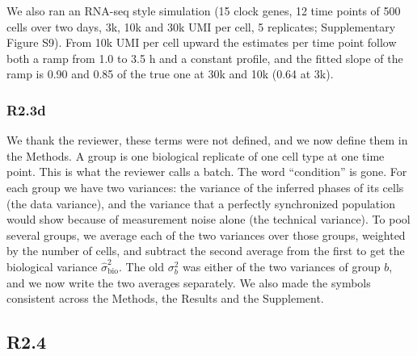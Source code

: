 We also ran an RNA-seq style simulation (15 clock genes, 12 time points of 500 cells over two days, 3k, 10k and 30k UMI per cell, 5 replicates; Supplementary Figure S9). From 10k UMI per cell upward the estimates per time point follow both a ramp from 1.0 to 3.5 h and a constant profile, and the fitted slope of the ramp is 0.90 and 0.85 of the true one at 30k and 10k (0.64 at 3k).

\figRampFish

\subsubsection*{R2.3d}


\response
We thank the reviewer, these terms were not defined, and we now define them in the Methods. A group is one biological replicate of one cell type at one time point. This is what the reviewer calls a batch. The word ``condition'' is gone. For each group we have two variances: the variance of the inferred phases of its cells (the data variance), and the variance that a perfectly synchronized population would show because of measurement noise alone (the technical variance). To pool several groups, we average each of the two variances over those groups, weighted by the number of cells, and subtract the second average from the first to get the biological variance $\hat\sigma^2_{\text{bio}}$. The old $\sigma_b^2$ was either of the two variances of group $b$, and we now write the two averages separately. We also made the symbols consistent across the Methods, the Results and the Supplement.
\subsection*{R2.4}


